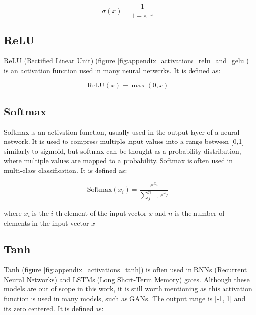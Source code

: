 \begin{equation*}
    \sigma(x) = \frac{1}{1 + e^{-x}}
\end{equation*}









\subsection*{ReLU}

ReLU (Rectified Linear Unit) (figure \ref{fig:appendix_activations_relu_and_gelu}) is an activation function used in many neural networks. It is defined as:

\begin{equation*}
    \text{ReLU}(x) = \max(0, x)
\end{equation*}








\subsection*{Softmax}

Softmax is an activation function, usually used in the output layer of a neural network. It is used to compress multiple input values into a range between [0,1] similarly to sigmoid, but softmax can be thought as a probability distribution, where multiple values are mapped to a probability. Softmax is often used in multi-class classification. It is defined as:

\begin{equation*}
    \text{Softmax}(x_i) = \frac{e^{x_i}}{\sum_{j=1}^{n} e^{x_j}}
\end{equation*}

where $x_i$ is the $i$-th element of the input vector $x$ and $n$ is the number of elements in the input vector $x$.






\subsection*{Tanh}

Tanh (figure \ref{fig:appendix_activations_tanh}) is often used in RNNs (Recurrent Neural Networks) and LSTMs (Long Short-Term Memory) gates. Although these models are out of scope in this work, it is still worth mentioning as this activation function is used in many models, such as GANs. The output range is [-1, 1] and its zero centered. It is defined as:

